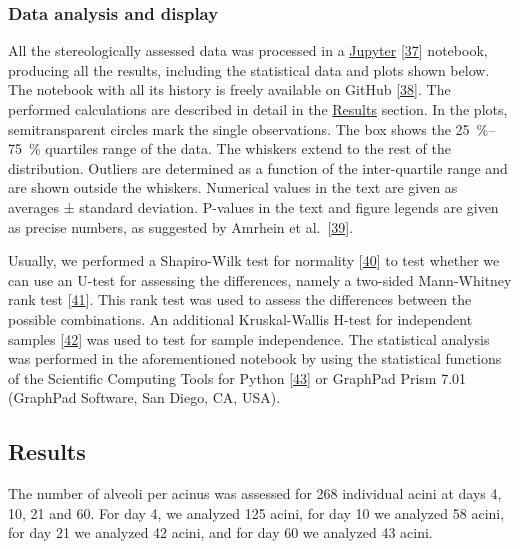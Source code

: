 \documentclass[
  american,
]{article}
\begin{document}
\hypertarget{data-analysis-and-display}{%
\subsubsection{Data analysis and display}\label{data-analysis-and-display}}

All the stereologically assessed data was processed in a \href{http://jupyter.org/}{Jupyter} {[}\protect\hyperlink{ref-pQ6Wbz73}{37}{]} notebook, producing all the results, including the statistical data and plots shown below.
The notebook with all its history is freely available on GitHub {[}\protect\hyperlink{ref-V87xbt0b}{38}{]}.
The performed calculations are described in detail in the \protect\hyperlink{results}{Results} section.
In the plots, semitransparent circles mark the single observations.
The box shows the 25~\%--75~\% quartiles range of the data.
The whiskers extend to the rest of the distribution.
Outliers are determined as a function of the inter-quartile range and are shown outside the whiskers.
Numerical values in the text are given as averages ± standard deviation.
P-values in the text and figure legends are given as precise numbers, as suggested by Amrhein et al.~{[}\protect\hyperlink{ref-o21zxPIu}{39}{]}.

Usually, we performed a Shapiro-Wilk test for normality {[}\protect\hyperlink{ref-IkHrgIj3}{40}{]} to test whether we can use an U-test for assessing the differences, namely a two-sided Mann-Whitney rank test {[}\protect\hyperlink{ref-MyzxBJ57}{41}{]}.
This rank test was used to assess the differences between the possible combinations.
An additional Kruskal-Wallis H-test for independent samples {[}\protect\hyperlink{ref-ON1Bppkk}{42}{]} was used to test for sample independence.
The statistical analysis was performed in the aforementioned notebook by using the statistical functions of the Scientific Computing Tools for Python {[}\protect\hyperlink{ref-8Miti2Gz}{43}{]} or GraphPad Prism 7.01 (GraphPad Software, San Diego, CA, USA).

\hypertarget{results}{%
\subsection{Results}\label{results}}

The number of alveoli per acinus was assessed for 268 individual acini at days 4, 10, 21 and 60.
For day 4, we analyzed 125 acini, for day 10 we analyzed 58 acini, for day 21 we analyzed 42 acini, and for day 60 we analyzed 43 acini.
\end{document}
